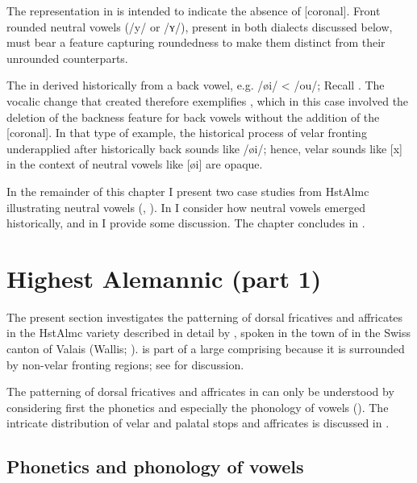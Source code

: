 The representation in  is intended to indicate the absence of [coronal]. Front rounded neutral vowels (/y/ or /ʏ/), present in both dialects discussed below, must bear a feature capturing roundedness to make them distinct from their unrounded counterparts.

The  in  derived historically from a back vowel, e.g. /øi/ < /ou/; Recall . The vocalic change that created  therefore exemplifies , which in this case involved the deletion of the backness feature for back vowels without the addition of the [coronal]. In that type of example, the historical process of velar fronting underapplied after historically back sounds like /øi/; hence, velar sounds like [x] in the context of neutral vowels like [øi] are opaque.

In the remainder of this chapter I present two case studies from HstAlmc illustrating neutral vowels (, ). In  I consider how neutral vowels emerged historically, and in  I provide some discussion. The chapter concludes in .

\section{Highest Alemannic (part 1)}\label{sec:6.2}

The present section investigates the patterning of dorsal fricatives and affricates in the HstAlmc variety described in detail by \citet{Wipf1910}, spoken in the town of  in the Swiss canton of Valais (Wallis; ).  is part of a large  comprising  because it is surrounded by non-velar fronting regions; see  for discussion.

The patterning of dorsal fricatives and affricates in  can only be understood by considering first the phonetics and especially the phonology of vowels (). The intricate distribution of velar and palatal stops and affricates is discussed in .

\subsection{Phonetics and phonology of vowels}\label{sec:6.2.1}

